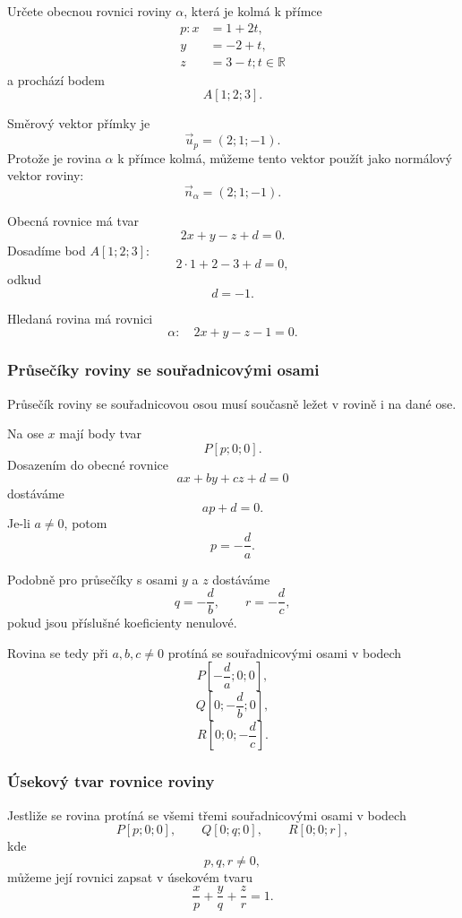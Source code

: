 \begin{example}
    \label{exa:Plane_perpendicular_to_line}
    Určete obecnou rovnici roviny $\alpha$, která je kolmá k přímce
    \[
        \begin{aligned}
            p: x&=1+2t,\\
            y&=-2+t,\\
            z&=3-t; t\in\mathbb{R}
        \end{aligned}
    \]
    a prochází bodem
    \[
        A[1;2;3].
    \]

    Směrový vektor přímky je
    \[
        \vec{u}_p=(2;1;-1).
    \]
    Protože je rovina $\alpha$ k přímce kolmá, můžeme tento vektor použít
    jako normálový vektor roviny:
    \[
        \vec{n}_{\alpha}=(2;1;-1).
    \]

    Obecná rovnice má tvar
    \[
        2x+y-z+d=0.
    \]
    Dosadíme bod $A[1;2;3]$:
    \[
        2\cdot1+2-3+d=0,
    \]
    odkud
    \[
        d=-1.
    \]

    Hledaná rovina má rovnici
    \[
        \alpha:\quad 2x+y-z-1=0.
    \]
\end{example}

\subsubsection{Průsečíky roviny se souřadnicovými osami}
\label{subsubsec:Plane_axis_intercepts}

Průsečík roviny se souřadnicovou osou musí současně ležet v rovině i na
dané ose.

Na ose $x$ mají body tvar
\[
    P[p;0;0].
\]
Dosazením do obecné rovnice
\[
    ax+by+cz+d=0
\]
dostáváme
\[
    ap+d=0.
\]
Je-li $a\neq0$, potom
\[
    p=-\frac{d}{a}.
\]

Podobně pro průsečíky s osami $y$ a $z$ dostáváme
\[
    q=-\frac{d}{b},
    \qquad
    r=-\frac{d}{c},
\]
pokud jsou příslušné koeficienty nenulové.

Rovina se tedy při $a,b,c\neq0$ protíná se souřadnicovými osami v bodech
\[
    P\left[-\frac{d}{a};0;0\right],
\]
\[
    Q\left[0;-\frac{d}{b};0\right],
\]
\[
    R\left[0;0;-\frac{d}{c}\right].
\]

\subsubsection{Úsekový tvar rovnice roviny}
\label{subsubsec:Intercept_form_plane}

Jestliže se rovina protíná se všemi třemi souřadnicovými osami v bodech
\[
    P[p;0;0],
    \qquad
    Q[0;q;0],
    \qquad
    R[0;0;r],
\]
kde
\[
    p,q,r\neq0,
\]
můžeme její rovnici zapsat v úsekovém tvaru
\begin{equation}
    \frac{x}{p}+\frac{y}{q}+\frac{z}{r}=1.
    \label{eq:Intercept_form_plane}
\end{equation}

